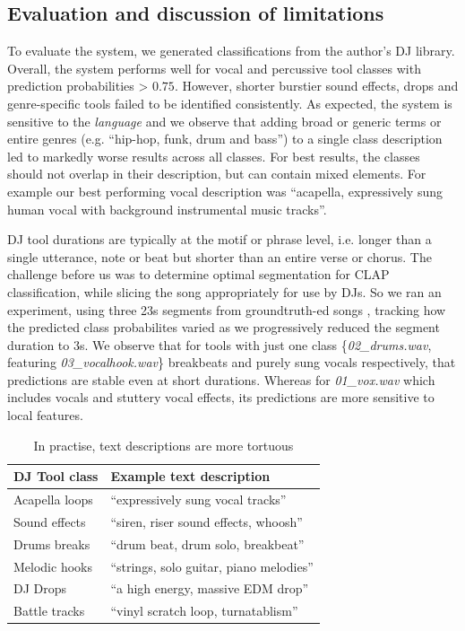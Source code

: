 \documentclass{article}
\begin{document}
\subsection{Evaluation and discussion of limitations}
To evaluate the system, we generated classifications from the author's DJ library. Overall, the system performs well for vocal and percussive tool classes with prediction probabilities > $0.75$. However, shorter burstier sound effects, drops and genre-specific tools failed to be identified consistently. As expected, the system is sensitive to the \textit{language} and we observe that adding broad or generic terms or entire genres (e.g. ``hip-hop, funk, drum and bass'') to a single class description led to markedly worse results across all classes. For best results, the classes should not overlap in their description, but can contain mixed elements. For example our best performing vocal description was ``acapella, expressively sung human vocal with background instrumental music tracks''. 

DJ tool durations are typically at the motif or phrase level, i.e. longer than a single utterance, note or beat but shorter than an entire verse or chorus. The challenge before us was to determine optimal segmentation for CLAP classification, while slicing the song appropriately for use by DJs. So we ran an experiment, using three 23s segments from groundtruth-ed songs \cite{MSS00401998, 91vocals2024}, tracking how the predicted class probabilites varied as we progressively reduced the segment duration to 3s.  We observe that for tools with just one class \{\textit{02\_drums.wav}, featuring \textit{03\_vocalhook.wav}\} breakbeats and purely sung vocals respectively, that predictions are stable even at short durations. Whereas for \textit{01\_vox.wav} which includes vocals and stuttery vocal effects, its predictions are more sensitive to local features.

\begin{table}
 \begin{center}
 \begin{tabular}{ll}
  \midrule
  \textbf{DJ Tool class} & \textbf{Example text description} \\
  \midrule
	Acapella loops & ``expressively sung vocal tracks''  \\
	Sound effects &  ``siren, riser sound effects, whoosh''\\
	Drums breaks  & ``drum beat, drum solo, breakbeat''  \\
	Melodic hooks & ``strings, solo guitar, piano melodies''  \\
	DJ Drops & ``a high energy, massive EDM drop''  \\
	Battle tracks & ``vinyl scratch loop, turnatablism''   \\
 \end{tabular}
\end{center}
 \caption{In practise, text descriptions are more tortuous}
 \label{tab:djtool_texts}
\end{table}
\end{document}
